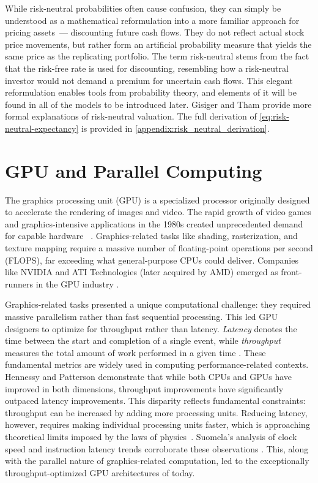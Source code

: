 \documentclass[english,12pt,a4paper,pdftex,sci,utf8]{aaltothesis}
\begin{document}
\noindent While risk-neutral probabilities often cause confusion, they can simply be understood as a mathematical reformulation into a more familiar approach for pricing assets~--- discounting future cash flows. They do not reflect actual stock price movements, but rather form an artificial probability measure that yields the same price as the replicating portfolio. The term risk-neutral stems from the fact that the risk-free rate is used for discounting, resembling how a risk-neutral investor would not demand a premium for uncertain cash flows. This elegant reformulation enables tools from probability theory, and elements of it will be found in all of the models to be introduced later. Gisiger \cite{gisiger2010risk} and Tham \cite{tham2001risk} provide more formal explanations of risk-neutral valuation. The full derivation of \cref{eq:risk-neutral-expectancy} is provided in \cref{appendix:risk_neutral_derivation}.

\clearpage

\section{GPU and Parallel Computing}\label{sec:gpu}

The graphics processing unit (GPU) is a specialized processor originally designed to accelerate the rendering of images and video. The rapid growth of video games and graphics-intensive applications in the 1980s created unprecedented demand for capable hardware ~\cite{sanders2010cuda, kirk2016programming}. Graphics-related tasks like shading, rasterization, and texture mapping require a massive number of floating-point operations per second (FLOPS), far exceeding what general-purpose CPUs could deliver. Companies like NVIDIA and ATI Technologies (later acquired by AMD) emerged as front-runners in the GPU industry \cite{sanders2010cuda}.

Graphics-related tasks presented a unique computational challenge: they required massive parallelism rather than fast sequential processing. This led GPU designers to optimize for throughput rather than latency. \emph{Latency} denotes the time between the start and completion of a single event, while \emph{throughput} measures the total amount of work performed in a given time \cite{hennessy2011computer}. These fundamental metrics are widely used in computing performance-related contexts. Hennessy and Patterson \cite{hennessy2011computer} demonstrate that while both CPUs and GPUs have improved in both dimensions, throughput improvements have significantly outpaced latency improvements. This disparity reflects fundamental constraints: throughput can be increased by adding more processing units. Reducing latency, however, requires making individual processing units faster, which is approaching theoretical limits imposed by the laws of physics~\cite{hennessy2011computer, sanders2010cuda}. Suomela's analysis of clock speed and instruction latency trends corroborate these observations \cite{suomela_ppc}. This, along with the parallel nature of graphics-related computation, led to the exceptionally throughput-optimized GPU architectures of today.
\end{document}
